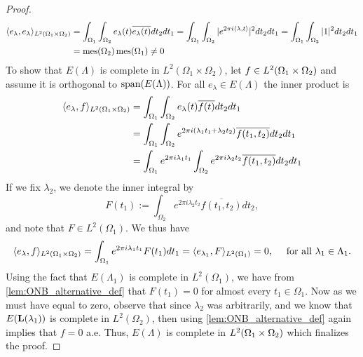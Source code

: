 \documentclass[../thesis.tex]{subfiles}
\begin{document}
\begin{proof}
    \begin{align*}
        \langle e_\lambda, e_\lambda\rangle_{L^2(\Omega_1 \times \Omega_2)}
        &= \int_{\Omega_1} \int_{\Omega_2} e_{\lambda}(t) \overline{e_{\lambda}(t)} dt_2 dt_1
        =\int_{\Omega_1} \int_{\Omega_2} |e^{2 \pi i \langle\lambda, t\rangle}|^2 dt_2 dt_1
        = \int_{\Omega_1} \int_{\Omega_2} |1|^2 dt_2 dt_1\\
        &= \operatorname{mes}(\Omega_2)\operatorname{mes}(\Omega_1) \neq 0
    \end{align*}
    To show that $E(\Lambda)$ is complete in $L^2(\Omega_1 \times \Omega_2)$, let $f\in L^2(\Omega_1 \times \Omega_2)$ and assume it is orthogonal to $\operatorname{span}(E(\Lambda))$. For all $e_\lambda \in E(\Lambda)$ the inner product is
    \begin{align*} %
        \braa{e_\lambda,f}_{L^2\brac{\Omega_1 \times \Omega_2}}
        &= \int_{\Omega_1} \int_{\Omega_2} e_\lambda(t) \overline{f(t)} dt_2dt_1 \\
        &= \int_{\Omega_1} \int_{\Omega_2} e^{2\pi i  (\lambda_1 t_1 + \lambda_2 t_2)} \overline{f(t_1,t_2)} dt_2 dt_1 \\
        &= \int_{\Omega_1} e^{2 \pi i \lambda_1 t_1} \int_{\Omega_2}e^{2 \pi i \lambda_2 t_2} \overline{f(t_1,t_2)} dt_2 dt_1
    \end{align*}
    If we fix $\lambda_2$, we denote the inner integral by 
    \begin{equation}\label{eq:inner_eq}
        F(t_1) := \int_{\Omega_2} e^{2 \pi i \lambda_2 t_2} \overline{f(t_1,t_2)} dt_2,
    \end{equation}
    and note that $F\in L^2(\Omega_1)$. We thus have %
    \begin{equation*}%
        \braa{e_{\lambda}, f}_{L^2(\Omega_1\times \Omega_2)} = \int_{\Omega_1} e^{2 \pi i \lambda_1 t_1} F(t_1) dt_1 = \braa{e_{\lambda_1}, F}_{L^2(\Omega_1)} = 0, \quad \text{ for all } \lambda_1 \in \Lambda_1 .
    \end{equation*}
    Using the fact that $E(\Lambda_1)$ is complete in $L^2(\Omega_1)$, we have from \cref{lem:ONB_alternative_def} that $F(t_1)=0$ for almost every $t_1 \in \Omega_1$. Now as we must have  equal to zero, observe that since $\lambda_2$ was arbitrarily, and we know that $E(\mathbf{L}(\lambda_1))$ is complete in $L^2(\Omega_2)$, then using \cref{lem:ONB_alternative_def} again implies that $f=0$ a.e. Thus, $E(\Lambda)$ is complete in $L^2(\Omega_1 \times \Omega_2)$ which finalizes the proof.

\end{proof}
\end{document}
